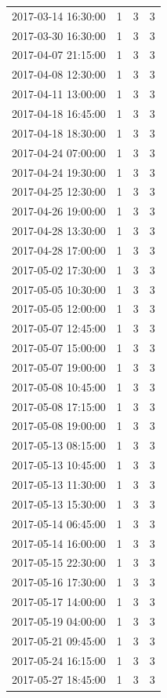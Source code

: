 \begin{tabular}{lrrr}
2017-03-14 16:30:00 & 1 & 3 & 3 \\
2017-03-30 16:30:00 & 1 & 3 & 3 \\
2017-04-07 21:15:00 & 1 & 3 & 3 \\
2017-04-08 12:30:00 & 1 & 3 & 3 \\
2017-04-11 13:00:00 & 1 & 3 & 3 \\
2017-04-18 16:45:00 & 1 & 3 & 3 \\
2017-04-18 18:30:00 & 1 & 3 & 3 \\
2017-04-24 07:00:00 & 1 & 3 & 3 \\
2017-04-24 19:30:00 & 1 & 3 & 3 \\
2017-04-25 12:30:00 & 1 & 3 & 3 \\
2017-04-26 19:00:00 & 1 & 3 & 3 \\
2017-04-28 13:30:00 & 1 & 3 & 3 \\
2017-04-28 17:00:00 & 1 & 3 & 3 \\
2017-05-02 17:30:00 & 1 & 3 & 3 \\
2017-05-05 10:30:00 & 1 & 3 & 3 \\
2017-05-05 12:00:00 & 1 & 3 & 3 \\
2017-05-07 12:45:00 & 1 & 3 & 3 \\
2017-05-07 15:00:00 & 1 & 3 & 3 \\
2017-05-07 19:00:00 & 1 & 3 & 3 \\
2017-05-08 10:45:00 & 1 & 3 & 3 \\
2017-05-08 17:15:00 & 1 & 3 & 3 \\
2017-05-08 19:00:00 & 1 & 3 & 3 \\
2017-05-13 08:15:00 & 1 & 3 & 3 \\
2017-05-13 10:45:00 & 1 & 3 & 3 \\
2017-05-13 11:30:00 & 1 & 3 & 3 \\
2017-05-13 15:30:00 & 1 & 3 & 3 \\
2017-05-14 06:45:00 & 1 & 3 & 3 \\
2017-05-14 16:00:00 & 1 & 3 & 3 \\
2017-05-15 22:30:00 & 1 & 3 & 3 \\
2017-05-16 17:30:00 & 1 & 3 & 3 \\
2017-05-17 14:00:00 & 1 & 3 & 3 \\
2017-05-19 04:00:00 & 1 & 3 & 3 \\
2017-05-21 09:45:00 & 1 & 3 & 3 \\
2017-05-24 16:15:00 & 1 & 3 & 3 \\
2017-05-27 18:45:00 & 1 & 3 & 3 \\

\end{tabular}
